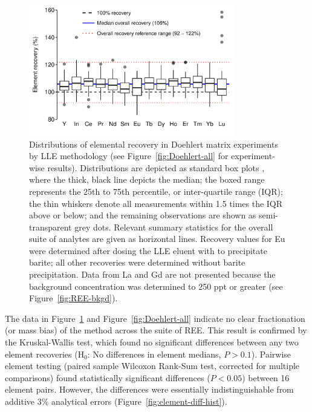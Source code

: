 \begin{figure}[htbp]
\begin{center}
\includegraphics[width=0.8\textwidth]{Ch4_figures/Doehlert-results.pdf}
\caption{Distributions of elemental recovery in Doehlert matrix experiments by LLE methodology (see Figure~\ref{fig:Doehlert-all} for experiment-wise results). Distributions are depicted as standard box plots \citep{boxplots},
where the thick, black line depicts the median;
the boxed range represents the 25th to 75th percentile, or inter-quartile range (IQR);
the thin whiskers denote all measurements within 1.5 times the IQR above or below;
and the remaining observations are shown as semi-transparent grey dots.
Relevant summary statistics for the overall suite of analytes are given as horizontal lines.
Recovery values for Eu were determined after dosing the LLE eluent with  to precipitate barite;
all other recoveries were determined without barite precipitation.
Data from La and Gd are not presented because the background concentration was determined to 250 ppt or greater (see Figure~\ref{fig:REE-bkgd}).}
\label{fig:Doehlert-summary}
\end{center}
\end{figure}


The data in Figure~\ref{fig:Doehlert-summary} and Figure~\ref{fig:Doehlert-all} indicate no clear fractionation (or mass bias) of the method across the suite of REE.
This result is confirmed by the Kruskal-Wallis test, which found no significant differences between any two element recoveries (H$_0$: No differences in element medians, $P > 0.1$).
Pairwise element testing (paired sample Wilcoxon Rank-Sum test, corrected for multiple comparisons) found statistically significant differences ($P < 0.05$) between 16 element pairs.
However, the differences were essentially indistinguishable from additive 3\% analytical errors (Figure~\ref{fig:element-diff-hist}).

